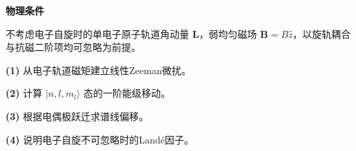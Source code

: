\textbf{物理条件}\par 不考虑电子自旋时的单电子原子轨道角动量 \(\boldsymbol L\)，弱均匀磁场 \(\boldsymbol B=B\hat z\)，以旋轨耦合与抗磁二阶项均可忽略为前提。
\par\noindent\textbf{(1)} 从电子轨道磁矩建立线性Zeeman微扰。
\par\noindent\textbf{(2)} 计算 \(|n,l,m_l\rangle\) 态的一阶能级移动。
\par\noindent\textbf{(3)} 根据电偶极跃迁求谱线偏移。
\par\noindent\textbf{(4)} 说明电子自旋不可忽略时的Landé因子。
